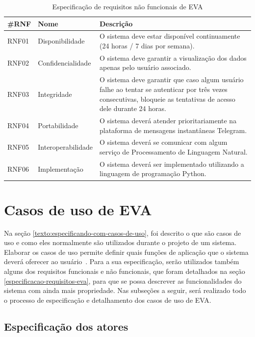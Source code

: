 \begin{table}[htb!]
\caption{Especificação de requisitos não funcionais de EVA}
\label{tabela:tabela2}
\center
\footnotesize
\begin{tabular}{|p{1.2cm}|p{3.5cm}|p{7.5cm}|}
  \hline
   \textbf{\#RNF} & \textbf{Nome}  & \textbf{Descrição}  \\
   \hline
    RNF01 & Disponibilidade & O sistema deve estar disponível continuamente (24 horas / 7 dias por semana). \\
   \hline
    RNF02 & Confidencialidade & O sistema deve garantir a visualização dos dados apenas pelo usuário associado. \\
   \hline
    RNF03 & Integridade & O sistema deve garantir que caso algum usuário falhe ao tentar se autenticar por três vezes consecutivas, bloqueie as tentativas de acesso dele durante 24 horas. \\
   \hline
   RNF04 & Portabilidade & O sistema deverá atender prioritariamente na plataforma de mensagens instantâneas Telegram. \\
   \hline
    RNF05 & Interoperabilidade & O sistema deverá se comunicar com algum serviço de Processamento de Linguagem Natural. \\
   \hline
    RNF06 & Implementação & O sistema deverá ser implementado utilizando a linguagem de programação Python. \\
   \hline
   
\end{tabular}
\end{table}\label{tabela:3}

\section{Casos de uso de EVA}

Na seção \ref{texto:especificando-com-casos-de-uso}, foi descrito o que são casos de uso e como eles normalmente são utilizados durante o projeto de um sistema. Elaborar os casos de uso permite definir quais funções de aplicação que o sistema deverá oferecer ao usuário~\cite{ReqJair}. Para a sua especificação, serão utilizados também alguns dos requisitos funcionais e não funcionais, que foram detalhados na seção \ref{especificacao-requisitos-eva}, para que se possa descrever as funcionalidades do sistema com ainda mais propriedade. Nas subseções a seguir, será realizado todo o processo de especificação e detalhamento dos casos de uso de EVA.

\subsection{Especificação dos atores}

